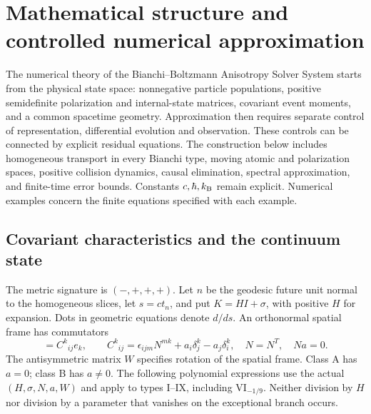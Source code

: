 \chapter{Mathematical structure and controlled numerical approximation}
\label{v:chapter}

The numerical theory of the Bianchi--Boltzmann Anisotropy Solver System starts from the physical state space: nonnegative particle populations, positive semidefinite polarization and internal-state matrices, covariant event moments, and a common spacetime geometry. Approximation then requires separate control of representation, differential evolution and observation. These controls can be connected by explicit residual equations. The construction below includes homogeneous transport in every Bianchi type, moving atomic and polarization spaces, positive collision dynamics, causal elimination, spectral approximation, and finite-time error bounds. Constants $c,\hbar,k_{\rm B}$ remain explicit. Numerical examples concern the finite equations specified with each example.

\section{Covariant characteristics and the continuum state}
\label{v:characteristics}

The metric signature is $(-,+,+,+)$. Let $n$ be the geodesic future unit normal to the homogeneous slices, let $s=ct_n$, and put $K=HI+\sigma$, with positive $H$ for expansion. Dots in geometric equations denote $d/ds$. An orthonormal spatial frame has commutators
\begin{equation}
 [e_i,e_j]=C^k{}_{ij}e_k,\qquad
 C^k{}_{ij}=\epsilon_{ijm}N^{mk}+a_i\delta^k_j-a_j\delta^k_i,
 \quad N=N^T,\quad Na=0.
 \label{v:bianchi}
\end{equation}
The antisymmetric matrix $W$ specifies rotation of the spatial frame. Class A has $a=0$; class B has $a\ne0$. The following polynomial expressions use the actual $(H,\sigma,N,a,W)$ and apply to types I--IX, including $\mathrm{VI}_{-1/9}$. Neither division by $H$ nor division by a parameter that vanishes on the exceptional branch occurs.

